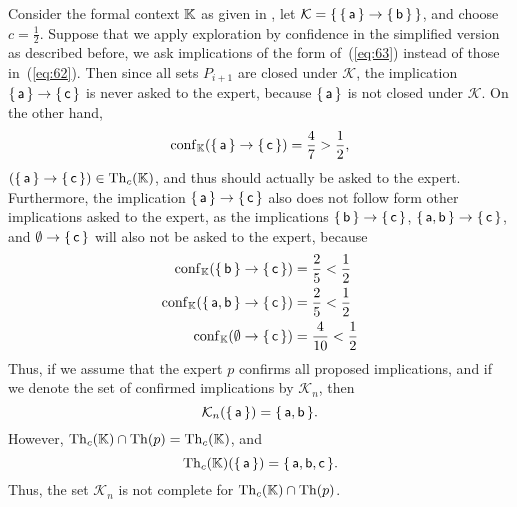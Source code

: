\begin{Example}
  Consider the formal context ${\mathbb{K}}$ as given in
  , let $\mathcal{K} = {\{\,
    {\{\,\mathsf{a}\,\}} \to {\ensuremath{\{\,\mathsf{b}\,\}}} \,\}}$, and choose $c = \frac 1 2$.  Suppose that we
  apply exploration by confidence in the simplified version as described before, \ie we
  ask implications of the form of~(\ref{eq:63}) instead of those in~(\ref{eq:62}).  Then
  since all sets $P_{i+1}$ are closed under $\mathcal{K}$, the implication ${\{\,
    \mathsf{a} \,\}} \to {\ensuremath{\{\, \mathsf{c} \,\}}}$ is never asked to the expert, because ${\{\,
    \mathsf{a} \,\}}$ is not closed under $\mathcal{K}$.  On the other hand,
  \begin{equation*}
    \operatorname{conf}_{{\mathbb{K}}} ( {\{\, \mathsf{a} \,\}} \to {\ensuremath{\{\, \mathsf{c} \,\}}}) = \frac 4 7 > \frac 1 2,
  \end{equation*}
  \ie $({\{\, \mathsf{a} \,\}} \to {\ensuremath{\{\, \mathsf{c} \,\}}}) \in \operatorname{Th}_{c}({\mathbb{K}})$, and thus should
  actually be asked to the expert.  Furthermore, the implication ${\{\, \mathsf{a} \,\}} \to
  {\ensuremath{\{\, \mathsf{c} \,\}}}$ also does not follow form other implications asked to the expert, as
  the implications ${\{\, \mathsf{b} \,\}} \to {\ensuremath{\{\, \mathsf{c} \,\}}}$, ${\{\, \mathsf{a},
    \mathsf{b} \,\}} \to {\ensuremath{\{\, \mathsf{c} \,\}}}$, and $\emptyset \to {\ensuremath{\{\, \mathsf{c} \,\}}}$ will also
  not be asked to the expert, because
  \begin{align*}
    \operatorname{conf}_{{\mathbb{K}}} ({\{\, \mathsf{b} \,\}} \to {\ensuremath{\{\, \mathsf{c} \,\}}}) &= \frac 2 5 < \frac 1 2\\
    \operatorname{conf}_{{\mathbb{K}}} ({\{\, \mathsf{a}, \mathsf{b} \,\}} \to {\ensuremath{\{\, \mathsf{c} \,\}}}) &= \frac 2 5 <
    \frac 1 2\\
    \operatorname{conf}_{{\mathbb{K}}}( \emptyset \to {\ensuremath{\{\, \mathsf{c} \,\}}} ) &= \frac 4 {10} < \frac 1 2
  \end{align*}
  Thus, if we assume that the expert $p$ confirms all proposed implications, and if we
  denote the set of confirmed implications by $\mathcal{K}_{n}$, then
  \begin{equation*}
    \mathcal{K}_{n}({\{\, \mathsf{a} \,\}}) = {\{\, \mathsf{a}, \mathsf{b} \,\}}.
  \end{equation*}
  However, $\operatorname{Th}_{c}({\mathbb{K}}) \cap \operatorname{Th}(p) = \operatorname{Th}_{c}({\mathbb{K}})$, and
  \begin{equation*}
    \operatorname{Th}_{c}({\mathbb{K}})({\{\, \mathsf{a} \,\}}) = {\{\, \mathsf{a}, \mathsf{b}, \mathsf{c} \,\}}.
  \end{equation*}
  Thus, the set $\mathcal{K}_{n}$ is not complete for $\operatorname{Th}_{c}({\mathbb{K}}) \cap \operatorname{Th}(p)$.
\end{Example}

